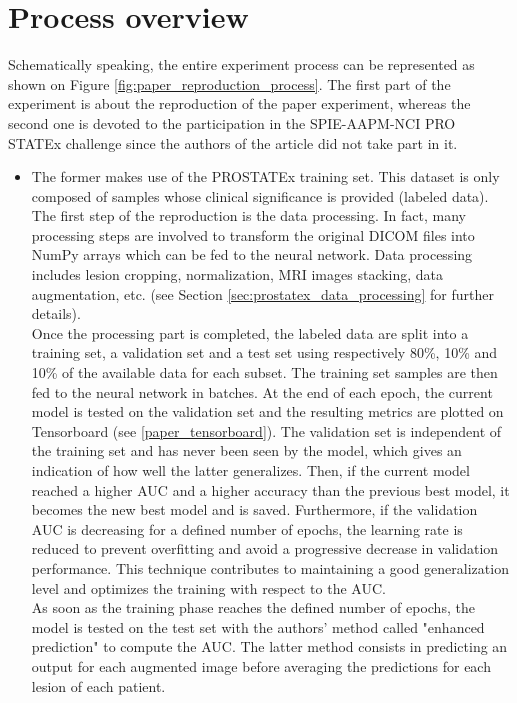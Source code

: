 \section{Process overview}
\setlength{\marginparwidth}{3cm}\leavevmode {}Schematically speaking, the entire experiment process can be represented as shown on Figure \ref{fig:paper_reproduction_process}. The first part of the experiment is about the reproduction of the paper experiment, whereas the second one is devoted to the participation in the SPIE-AAPM-NCI PRO\- STATEx challenge since the authors of the article did not take part in it.\\
\begin{itemize}


\item The former makes use of the PROSTATEx training set. This dataset is only composed of samples whose clinical significance is provided (labeled data). The first step of the reproduction is the data processing. In fact, many processing steps are involved to transform the original DICOM files into NumPy arrays which can be fed to the neural network. Data processing includes lesion cropping, normalization, MRI images stacking, data augmentation, etc. (see Section \ref{sec:prostatex_data_processing} for further details).\\
Once the processing part is completed, the labeled data are split into a training set, a validation set and a test set using respectively 80\%, 10\% and 10\% of the available data for each subset. The training set samples are then fed to the neural network in batches. 
At the end of each epoch, the current model is tested on the validation set and the resulting metrics are plotted on Tensorboard (see \ref{paper_tensorboard}). The validation set is independent of the training set and has never been seen by the model, which gives an indication of how well the latter generalizes. Then, if the current model reached a higher AUC and a higher accuracy than the previous best model, it becomes the new best model and is saved. Furthermore, if the validation AUC is decreasing for a defined number of epochs, the learning rate is reduced to prevent overfitting and avoid a  progressive decrease in validation performance. This technique contributes to maintaining a good generalization level and optimizes the training with respect to the AUC.\\
As soon as the training phase reaches the defined number of epochs, the model is tested on the test set with the authors' method called "enhanced prediction" to compute the AUC. The latter method consists in predicting an output for each augmented image before averaging the predictions for each lesion of each patient.


\end{itemize}

